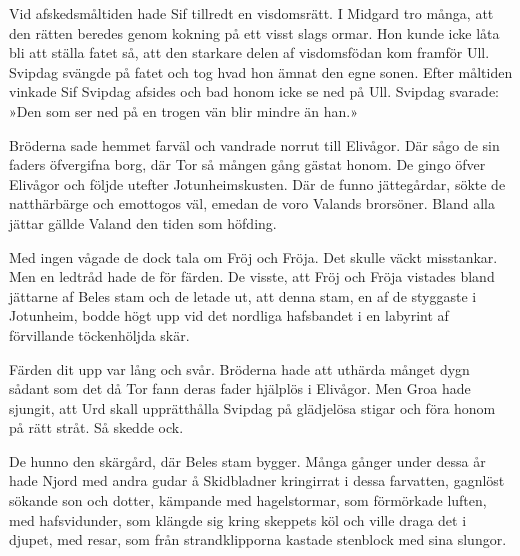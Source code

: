 Vid afskedsmåltiden hade Sif tillredt en visdomsrätt. I Midgard tro
många, att den rätten beredes genom kokning på ett visst slags ormar.
Hon kunde icke låta bli att ställa fatet så, att den starkare delen af
visdomsfödan kom framför Ull. Svipdag svängde på fatet och tog hvad hon
ämnat den egne sonen. Efter måltiden vinkade Sif Svipdag afsides och bad
honom icke se ned på Ull. Svipdag svarade: »Den som ser ned på en trogen
vän blir mindre än han.»

Bröderna sade hemmet farväl och vandrade norrut till Elivågor. Där sågo
de sin faders öfvergifna borg, där Tor
\protect\hypertarget{lb1625905.xhtmlux5cux23start107}{}{}\protect\hypertarget{lb1625905.xhtmlux5cux23start107-a}{}{}\protect\hypertarget{lb1625905.xhtmlux5cux23start107-b}{}{}\protect\hypertarget{lb1625905.xhtmlux5cux23start107-c}{}{}\protect\hypertarget{lb1625905.xhtmlux5cux23start107-d}{}{}
så mången gång gästat honom. De gingo öfver Elivågor och följde utefter
Jotunheimskusten. Där de funno jättegårdar, sökte de natthärbärge och
emottogos väl, emedan de voro Valands brorsöner. Bland alla jättar
gällde Valand den tiden som höfding.

Med ingen vågade de dock tala om Fröj och Fröja. Det skulle väckt
misstankar. Men en ledtråd hade de för färden. De visste, att Fröj och
Fröja vistades bland jättarne af Beles stam och de letade ut, att denna
stam, en af de styggaste i Jotunheim, bodde högt upp vid det nordliga
hafsbandet i en labyrint af förvillande töckenhöljda skär.

Färden dit upp var lång och svår. Bröderna hade att uthärda månget dygn
sådant som det då Tor fann deras fader hjälplös i Elivågor. Men Groa
hade sjungit, att Urd skall upprätthålla Svipdag på glädjelösa stigar
och föra honom på rätt stråt. Så skedde ock.

De hunno den skärgård, där Beles stam bygger. Många gånger under dessa
år hade Njord med andra gudar å Skidbladner kringirrat i dessa
farvatten, gagnlöst sökande son och dotter, kämpande med hagelstormar,
som förmörkade luften, med hafsvidunder, som klängde sig kring skeppets
köl och ville draga det i djupet, med resar, som från strandklipporna
kastade stenblock med sina slungor.

